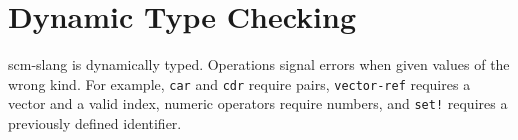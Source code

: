 \section{Dynamic Type Checking}

scm-slang is dynamically typed. Operations signal errors when given values of
the wrong kind. For example, \texttt{car} and \texttt{cdr} require pairs,
\texttt{vector-ref} requires a vector and a valid index, numeric operators
require numbers, and \texttt{set!} requires a previously defined identifier.
